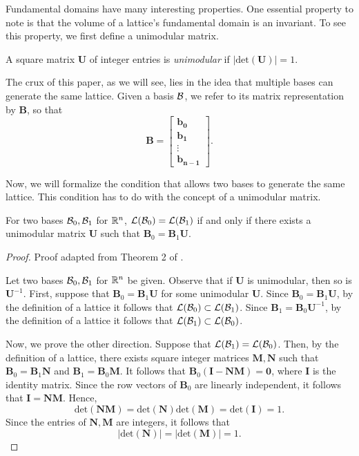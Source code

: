 \documentclass[a4paper,12pt]{article}
\begin{document}
Fundamental domains have many interesting properties. One essential property to note is that the volume of a lattice's fundamental domain is an invariant. To see this property, we first define a unimodular matrix. 
\begin{defn}
    A square matrix $\mathbf{U}$ of integer entries is \textit{unimodular} if $|\text{det}(\mathbf{U})|=1$.
\end{defn}

The crux of this paper, as we will see, lies in the idea that multiple bases can generate the same lattice. Given a basis $\mathcal{B}$, we refer to its matrix representation by $\mathbf{B}$, so that 
$$\mathbf{B} = 
\begin{bmatrix}
    \mathbf{b_0}\\
    \mathbf{b_1}\\
    \vdots\\
    \mathbf{b_{n-1}}
\end{bmatrix}.
$$

Now, we will formalize the condition that allows two bases to generate the same lattice. This condition has to do with the concept of a unimodular matrix. 

\begin{thm}
    For two bases $\mathcal{B}_{0},\mathcal{B}_{1}$ for $\mathbb{R}^n$, $\mathcal{L}(\mathcal{B}_0)=\mathcal{L}(\mathcal{B}_1)$ if and only if there exists a unimodular matrix $\mathbf{U}$ such that $\mathbf{B}_{0} = \mathbf{B}_{1}\mathbf{U}$.
\end{thm}

\begin{proof}
    Proof adapted from Theorem 2 of \cite{MicciancioLec2}.
    
    Let two bases $\mathcal{B}_{0},\mathcal{B}_{1}$ for $\mathbb{R}^n$ be given. Observe that if $\mathbf{U}$ is unimodular, then so is $\mathbf{U}^{-1}$. First, suppose that $\mathbf{B}_{0} = \mathbf{B}_{1}\mathbf{U}$ for some unimodular $\mathbf{U}$. Since $\mathbf{B}_{0} = \mathbf{B}_{1}\mathbf{U}$, by the definition of a lattice it follows that $\mathcal{L}(\mathcal{B}_0) \subset \mathcal{L}(\mathcal{B}_1)$. Since $\mathbf{B}_{1} = \mathbf{B}_{0}\mathbf{U}^{-1}$, by the definition of a lattice it follows that $\mathcal{L}(\mathcal{B}_1) \subset \mathcal{L}(\mathcal{B}_0)$. 
    
    Now, we prove the other direction. Suppose that $\mathcal{L}(\mathcal{B}_1) = \mathcal{L}(\mathcal{B}_0)$. Then, by the definition of a lattice, there exists square integer matrices $\mathbf{M}, \mathbf{N}$ such that $\mathbf{B}_{0} = \mathbf{B}_{1}\mathbf{N}$ and $\mathbf{B}_{1} = \mathbf{B}_{0}\mathbf{M}$. It follows that $\mathbf{B}_{0}(\mathbf{I} - \mathbf{N}\mathbf{M}) = \mathbf{0}$, where $\mathbf{I}$ is the identity matrix. Since the row vectors of $\mathbf{B}_{0}$ are linearly independent, it follows that $\mathbf{I} = \mathbf{N}\mathbf{M}$. Hence, $$\text{det}(\mathbf{N}\mathbf{M}) =  \text{det}(\mathbf{N})\text{det}(\mathbf{M}) = \text{det}(\mathbf{I}) = 1.$$ Since the entries of $\mathbf{N}, \mathbf{M}$ are integers, it follows that $$|\text{det}(\mathbf{N})| = |\text{det}(\mathbf{M})| = 1.$$
\end{proof}
\end{document}
